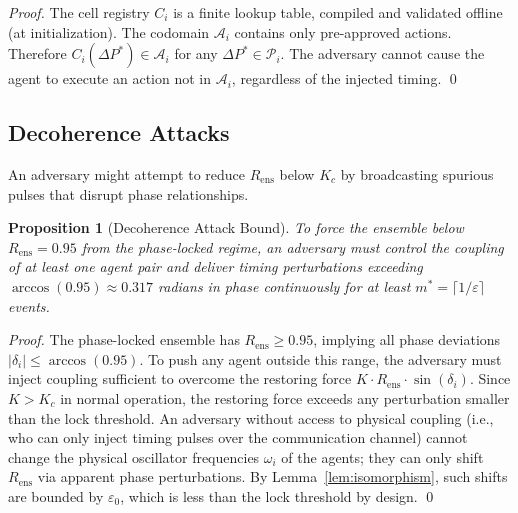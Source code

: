 \documentclass[twocolumn,10pt]{article}
\newtheorem{proposition}[theorem]{Proposition}
\newcommand{\Rens}{R_{\mathrm{ens}}}
\newcommand{\Kc}{K_c}
\newcommand{\DeltaP}{\Delta P}
\begin{document}
\begin{proof}
The cell registry $C_i$ is a finite lookup table, compiled and validated
offline (at initialization). The codomain $\mathcal{A}_i$ contains only
pre-approved actions. Therefore $C_i(\DeltaP^*) \in \mathcal{A}_i$ for any
$\DeltaP^* \in \mathcal{P}_i$. The adversary cannot cause the agent to execute
an action not in $\mathcal{A}_i$, regardless of the injected timing. \qed
\end{proof}

\subsection{Decoherence Attacks}

An adversary might attempt to reduce $\Rens$ below $\Kc$ by broadcasting
spurious pulses that disrupt phase relationships.

\begin{proposition}[Decoherence Attack Bound]
\label{prop:decoherence_attack}
To force the ensemble below $\Rens = 0.95$ from the phase-locked regime, an
adversary must control the coupling of \emph{at least one agent pair} and
deliver timing perturbations exceeding $\arccos(0.95) \approx 0.317$ radians
in phase continuously for at least $m^* = \lceil 1/\varepsilon \rceil$ events.
\end{proposition}

\begin{proof}
The phase-locked ensemble has $\Rens \geq 0.95$, implying all phase deviations
$|\delta_i| \leq \arccos(0.95)$. To push any agent outside this range, the
adversary must inject coupling sufficient to overcome the restoring force
$K \cdot \Rens \cdot \sin(\delta_i)$. Since $K > \Kc$ in normal operation,
the restoring force exceeds any perturbation smaller than the lock threshold.
An adversary without access to physical coupling (i.e., who can only inject
timing pulses over the communication channel) cannot change the physical
oscillator frequencies $\omega_i$ of the agents; they can only shift $\Rens$
via apparent phase perturbations. By Lemma~\ref{lem:isomorphism}, such shifts
are bounded by $\varepsilon_0$, which is less than the lock threshold by
design. \qed
\end{proof}
\end{document}
